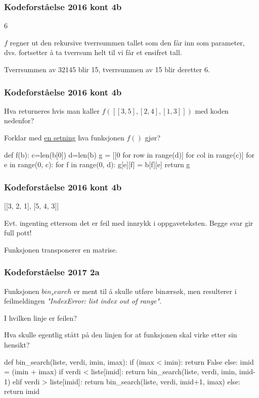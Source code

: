 \begin{frame}
    \frametitle{Kodeforståelse 2016 kont 4b}

    6

    $f$ regner ut den rekursive tverrsummen tallet som den får inn som parameter, dvs. fortsetter å ta tverrsum helt til vi får et ensifret tall. 

    Tverrsummen av 32145 blir 15, tverrsummen av 15 blir deretter 6. 

\end{frame}

\begin{frame}[fragile]
    \frametitle{Kodeforståelse 2016 kont 4b}

    Hva returneres hvis man kaller $f([[3, 5], [2, 4], [1, 3]])$ med koden nedenfor? 

    Forklar med \underline{en setning} hva funksjonen $f()$ gjør? 

\begin{python}
def f(b): 
    c=len(b[0])
    d=len(b)
    g = [[0 for row in range(d)]
        for col in range(c)]
    for e in range(0, c):
        for f in range(0, d): 
            g[e][f] = b[f][e]
    return g
\end{python}

\end{frame}

\begin{frame}
    \frametitle{Kodeforståelse 2016 kont 4b}

    [[3, 2, 1], [5, 4, 3]]

    Evt. ingenting ettersom det er feil med innrykk i oppgaveteksten. 
    Begge svar gir full pott!

    Funksjonen transponerer en matrise. 

\end{frame}

\begin{frame}[fragile]
    \frametitle{Kodeforståelse 2017 2a}

    Funksjonen $bin_search$ er ment til å skulle utføre binærsøk, men resulterer i feilmeldingen \textit{"IndexError: list index out of range"}. 

    I hvilken linje er feilen? 

    Hva skulle egentlig stått på den linjen for at funksjonen skal virke etter sin hensikt? 

\begin{python}
def bin_search(liste, verdi, imin, imax): 
    if (imax < imin): 
        return False
    else: 
        imid = (imin + imax)
        if verdi < liste[imid]: 
            return bin_search(liste, verdi, imin, imid-1)
        elif verdi > liste[imid]: 
            return bin_search(liste, verdi, imid+1, imax)
        else: 
            return imid
\end{python}

\end{frame}

